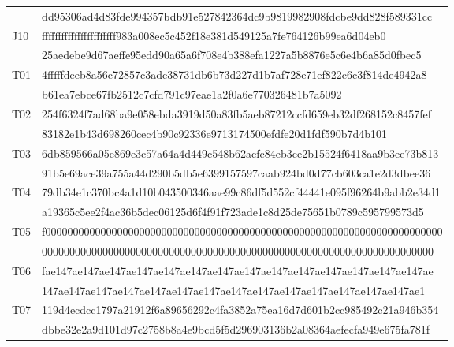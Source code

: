 \begin{table}[htbp]
\begin{tabular}{@{}l@{\quad}l@{}}
    & dd95306ad4d83fde994357bdb91e527842364dc9b9819982908fdcbe9dd828f589331cc\\[.3ex]
J10 & fffffffffffffffffffffff983a008ec5c452f18e381d549125a7fe764126b99ea6d04eb0\\*
    & 25aedebe9d67aeffe95edd90a65a6f708e4b388efa1227a5b8876e5c6e4b6a85d0fbec5\\[.3ex]
T01 & 4fffffdeeb8a56c72857c3adc38731db6b73d227d1b7af728e71ef822c6c3f814de4942a8\\*
    & b61ea7ebce67fb2512c7cfd791c97eae1a2f0a6e770326481b7a5092\\[.3ex]
T02 & 254f6324f7ad68ba9e058ebda3919d50a83fb5aeb87212ccfd659eb32df268152c8457fef\\*
    & 83182e1b43d698260cec4b90c92336e9713174500efdfe20d1fdf590b7d4b101\\[.3ex]
T03 & 6db859566a05e869e3c57a64a4d449c548b62acfc84eb3ce2b15524f6418aa9b3ee73b813\\*
    & 91b5e69ace39a755a44d290b5db5e6399157597caab924bd0d77cb603ca1e2d3dbee36\\[.3ex]
T04 & 79db34e1c370bc4a1d10b043500346aae99c86df5d552cf44441e095f96264b9abb2e34d1\\*
    & a19365c5ee2f4ac36b5dec06125d6f4f91f723ade1c8d25de75651b0789c595799573d5\\[.3ex]
T05 & f000000000000000000000000000000000000000000000000000000000000000000000000\\*
    & 00000000000000000000000000000000000000000000000000000000000000000000000\\[.3ex]
T06 & fae147ae147ae147ae147ae147ae147ae147ae147ae147ae147ae147ae147ae147ae147ae\\*
    & 147ae147ae147ae147ae147ae147ae147ae147ae147ae147ae147ae147ae147ae147ae1\\[.3ex]
T07 & 119d4ecdcc1797a21912f6a89656292c4fa3852a75ea16d7d601b2cc985492c21a946b354\\*
    & dbbe32e2a9d101d97c2758b8a4e9bcd5f5d296903136b2a08364aefecfa949e675fa781f\\[.3ex]
\bottomrule\end{tabular}
\end{table}
